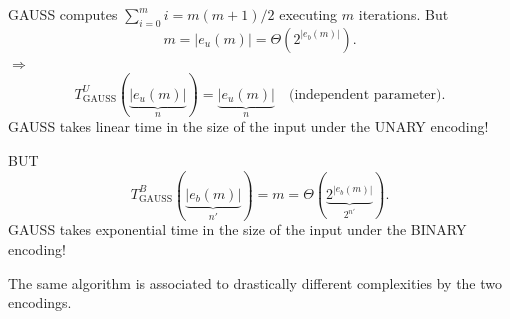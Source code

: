 GAUSS computes $\sum_{i=0}^m i=m(m+1)/2$ executing $m$ iterations. But
\[
m=|e_u(m)|=\Theta(2^{|e_b(m)|}).
\]
$\Rightarrow$
\[
T^U_{\mathrm{GAUSS}}(\underbrace{|e_u(m)|}_{n})=\underbrace{|e_u(m)|}_{n}
\quad\text{(independent parameter)}.
\]
GAUSS takes linear time in the size of the input under the UNARY encoding!

BUT
\[
T^B_{\mathrm{GAUSS}}(\underbrace{|e_b(m)|}_{n'})=m=\Theta(\underbrace{2^{|e_b(m)|}}_{2^{n'}}).
\]
GAUSS takes exponential time in the size of the input under the BINARY encoding!

The same algorithm is associated to drastically different complexities by the two encodings.
